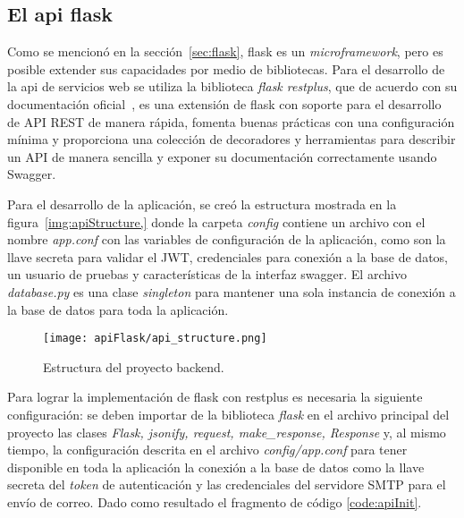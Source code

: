 \subsection{El api flask} \label{sec:apiFlask}

Como se mencionó en la sección~\ref{sec:flask}, flask es un \textit{microframework}, pero es posible extender sus capacidades por medio de bibliotecas. Para el desarrollo de la api de servicios web se utiliza la biblioteca \textit{flask restplus}, que de acuerdo con su documentación oficial~\cite{noauthor_flask-restplus_2020}, es una extensión de flask con soporte para el desarrollo de API REST de manera rápida, fomenta buenas prácticas con una configuración mínima y proporciona una colección de decoradores y herramientas para describir un API de manera sencilla y exponer su documentación correctamente usando Swagger.

Para el desarrollo de la aplicación, se creó la estructura mostrada en la figura~\ref{img:apiStructure,} donde la carpeta \textit{config} contiene un archivo con el nombre \textit{app.conf} con las variables de configuración de la aplicación, como son la llave secreta para validar el JWT, credenciales para conexión a la base de datos, un usuario de pruebas y características de la interfaz swagger. El archivo \textit{database.py} es una clase \textit{singleton} para mantener una sola instancia de conexión a la base de datos para toda la aplicación.

\begin{figure}[H]
  \centering
  \texttt{[image: apiFlask/api\_structure.png]}
  \caption{Estructura del proyecto backend.}
  \label{img:apiStructure}
\end{figure}

Para lograr la implementación de flask con restplus es necesaria la siguiente configuración: se deben importar de la biblioteca \textit{flask} en el archivo principal del proyecto las clases \textit{Flask, jsonify, request, make\_response, Response} y, al mismo tiempo, la configuración descrita en el archivo \textit{config/app.conf} para tener disponible en toda la aplicación la conexión a la base de datos como la llave secreta del \textit{token} de autenticación y las credenciales del servidore SMTP para el envío de correo. Dado como resultado el fragmento de código \ref{code:apiInit}.

